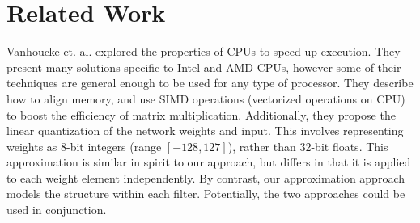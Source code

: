 \documentclass{article}
\begin{document}







\section{Related Work}


Vanhoucke et. al. \cite{vanhoucke2011improving} explored the
properties of CPUs to speed up execution.  They present many solutions
specific to Intel and AMD CPUs, however some of their techniques are
general enough to be used for any type of processor.  They describe
how to align memory, and use SIMD operations (vectorized operations on
CPU) to boost the efficiency of matrix multiplication.  Additionally, they
propose the linear quantization of the network weights and input. This
involves representing weights as 8-bit integers (range
$[-128, 127]$), rather than 32-bit floats. This approximation is
similar in spirit to our approach, but differs in that it is applied
to each weight element independently. By contrast, our approximation approach models
the structure within each filter. Potentially, the two approaches
could be used in conjunction. 
\end{document}
